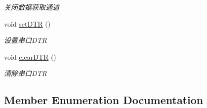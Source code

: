 \begin{DoxyCompactItemize}
\begin{DoxyCompactList}\small\item\em 关闭数据获取通道 ~\newline
\end{DoxyCompactList}\item 
void \hyperlink{classydlidar_1_1_y_dlidar_driver_a88de43cf13058344fc83389cb9df7e21}{set\+D\+TR} ()\hypertarget{classydlidar_1_1_y_dlidar_driver_a88de43cf13058344fc83389cb9df7e21}{}\label{classydlidar_1_1_y_dlidar_driver_a88de43cf13058344fc83389cb9df7e21}

\begin{DoxyCompactList}\small\item\em 设置串口\+D\+TR ~\newline
\end{DoxyCompactList}\item 
void \hyperlink{classydlidar_1_1_y_dlidar_driver_a67fe00d7458cdb52b4160d745b8ecd32}{clear\+D\+TR} ()\hypertarget{classydlidar_1_1_y_dlidar_driver_a67fe00d7458cdb52b4160d745b8ecd32}{}\label{classydlidar_1_1_y_dlidar_driver_a67fe00d7458cdb52b4160d745b8ecd32}

\begin{DoxyCompactList}\small\item\em 清除串口\+D\+TR ~\newline
\end{DoxyCompactList}\end{DoxyCompactItemize}


\subsection{Member Enumeration Documentation}
